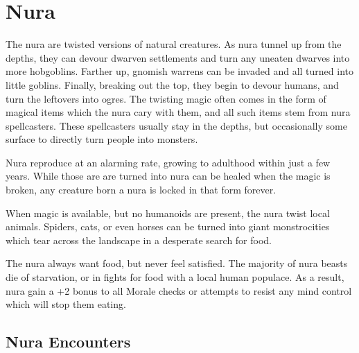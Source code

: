 \chapter{Nura}

\label{nura}
The nura are twisted versions of natural creatures.
As nura tunnel up from the depths, they can devour dwarven settlements and turn any uneaten dwarves into more hobgoblins.
Farther up, gnomish warrens can be invaded and all turned into little goblins.
Finally, breaking out the top, they begin to devour humans, and turn the leftovers into ogres.
The twisting magic often comes in the form of magical items which the nura cary with them, and all such items stem from nura spellcasters.
These spellcasters usually stay in the depths, but occasionally some surface to directly turn people into monsters.

Nura reproduce at an alarming rate, growing to adulthood within just a few years.
While those are are turned into nura can be healed when the magic is broken, any creature born a nura is locked in that form forever.

When magic is available, but no humanoids are present, the nura twist local animals.
Spiders, cats, or even horses can be turned into giant monstrocities which tear across the landscape in a desperate search for food.

The nura always want food, but never feel satisfied.
The majority of nura beasts die of starvation, or in fights for food with a local human populace.
As a result, nura gain a +2 bonus to all Morale checks or attempts to resist any mind control which will stop them eating.

\section{Nura Encounters}

